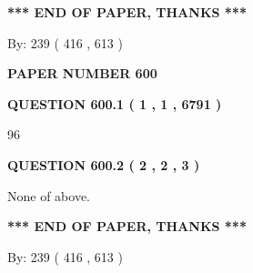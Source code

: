 \documentclass[12pt]{article}
\begin{document}
   
   
\vspace{1.0in} 
{\textbf{\large{ *** END OF PAPER, THANKS *** }}} 
   
   
\hspace{1.0in} By: 
 239 ( 416 ,  613 )
   
   
   
   
\newpage 
\setcounter{page}{ 
   600001 } 
   
   
   
   
 {\textbf{ \Large{ PAPER NUMBER  600  }}}
   
   
\vspace{0.2in}
   
   
   
   
   
   
 \vspace{0.2in}
 
 
 
 
   
   
  
\vspace{0.2in}
  
{\textbf{\Large{QUESTION
600.1 
 ( 1 , 1 , 6791 )
}}}
  
  
 
 
\noindent{}

96
 
 
  
\vspace{0.2in}
  
{\textbf{\Large{QUESTION
600.2 
 ( 2 , 2 , 3 )
}}}
  
  
 
 
\noindent{}
 
 
 None of above.
 
 
 
 
   
   
 \vspace{0.2in}
 
   
   
   
   
\vspace{1.0in} 
{\textbf{\large{ *** END OF PAPER, THANKS *** }}} 
   
   
\hspace{1.0in} By: 
 239 ( 416 ,  613 )
   
\end{document}
